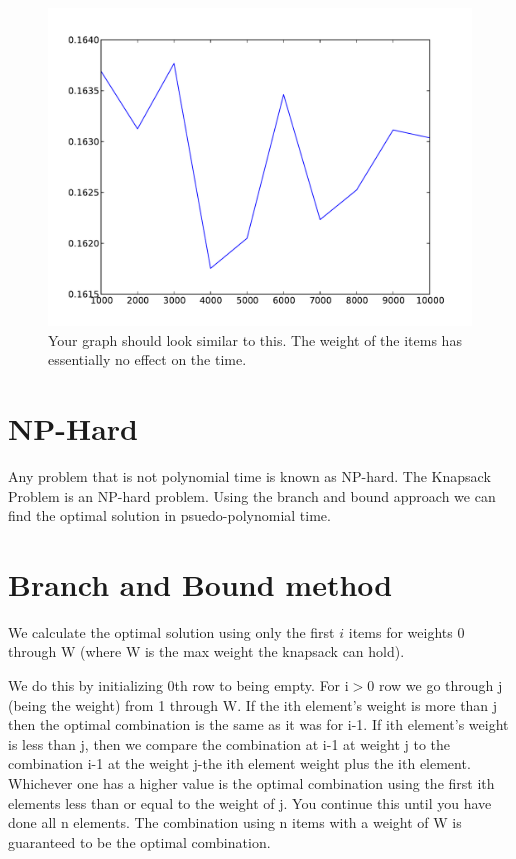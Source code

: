 \begin{figure}[H]
\includegraphics[scale = .5]{naiveWeight.pdf}
\caption{
Your graph should look similar to this.
The weight of the items has essentially no effect on the time.}
\end{figure}

\section*{NP-Hard}

Any problem that is not polynomial time is known as NP-hard.
The Knapsack Problem is an NP-hard problem.
Using the branch and bound approach we can find the optimal solution in psuedo-polynomial time.

\section*{Branch and Bound method}

We calculate the optimal solution using only the first $i$ items for weights 0 through W (where W is the max weight the knapsack can hold).

We do this by initializing 0th row to being empty.
For i$>$0 row we go through j (being the weight) from 1 through W.
If the ith element's weight is more than j then the optimal combination is the same as it was for i-1.
If ith element's weight is less than j, then we compare the combination at i-1 at weight j to the combination i-1 at the weight j-the ith element weight plus the ith element.
Whichever one has a higher value is the optimal combination using the first ith elements less than or equal to the weight of j.
You continue this until you have done all n elements.
The combination using n items with a weight of W is guaranteed to be the optimal combination.

